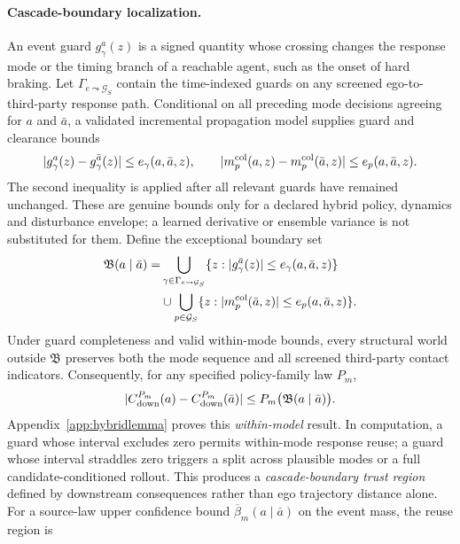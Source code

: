 \documentclass[10pt]{article}
\begin{document}
\paragraph{Cascade-boundary localization.}
An event guard $g_\gamma^{a}(z)$ is a signed quantity whose crossing changes the response mode or the timing branch of a reachable agent, such as the onset of hard braking. Let $\Gamma_{e\leadsto\mathcal G_S}$ contain the time-indexed guards on any screened ego-to-third-party response path. Conditional on all preceding mode decisions agreeing for $a$ and $\bar a$, a validated incremental propagation model supplies guard and clearance bounds
\begin{equation}
 |g_\gamma^{a}(z)-g_\gamma^{\bar a}(z)|\le e_\gamma(a,\bar a,z),\qquad
 |m_p^{\rm col}(a,z)-m_p^{\rm col}(\bar a,z)|\le e_p(a,\bar a,z).
 \label{eq:guardbounds}
\end{equation}
The second inequality is applied after all relevant guards have remained unchanged. These are genuine bounds only for a declared hybrid policy, dynamics and disturbance envelope; a learned derivative or ensemble variance is not substituted for them. Define the exceptional boundary set
\begin{align}
 \mathfrak B(a\mid\bar a)=&\bigcup_{\gamma\in\Gamma_{e\leadsto\mathcal G_S}}
 \{z:|g_\gamma^{\bar a}(z)|\le e_\gamma(a,\bar a,z)\}\nonumber\\
 &\cup\bigcup_{p\in\mathcal G_S}
 \{z:|m_p^{\rm col}(\bar a,z)|\le e_p(a,\bar a,z)\}.
 \label{eq:boundaryevent}
\end{align}
Under guard completeness and valid within-mode bounds, every structural world outside $\mathfrak B$ preserves both the mode sequence and all screened third-party contact indicators. Consequently, for any specified policy-family law $P_m$,
\begin{equation}
 |C_{\rm down}^{P_m}(a)-C_{\rm down}^{P_m}(\bar a)|
 \le P_m\bigl(\mathfrak B(a\mid\bar a)\bigr).
 \label{eq:boundarymass}
\end{equation}
Appendix~\ref{app:hybridlemma} proves this \emph{within-model} result. In computation, a guard whose interval excludes zero permits within-mode response reuse; a guard whose interval straddles zero triggers a split across plausible modes or a full candidate-conditioned rollout. This produces a \emph{cascade-boundary trust region} defined by downstream consequences rather than ego trajectory distance alone. For a source-law upper confidence bound $\overline\beta_m(a\mid\bar a)$ on the event mass, the reuse region is
\end{document}
